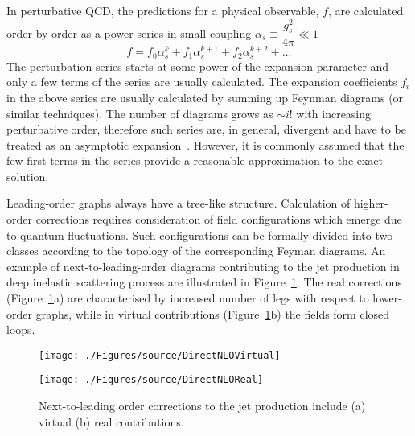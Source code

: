 In perturbative QCD, the predictions for a physical observable, $f$, are calculated order-by-order as a power series in small coupling $\alpha_s \equiv \dfrac{g_s^2}{4\pi} \ll 1$
\begin{equation}
   f=f_{0}\alpha^{k}_s + f_{1}\alpha^{k+1}_s + f_{2}\alpha^{k+2}_s + \ldots
	 \label{eq:pertseries}
\end{equation}
The perturbation series starts at some power of the expansion parameter and only a few terms of the series are usually calculated. The expansion coefficients $f_i$ in the above series are usually calculated by summing up Feynman diagrams (or similar techniques). The number of diagrams grows as $\sim i!$ with increasing perturbative order, therefore such series are, in general, divergent and have to be treated as an asymptotic expansion~\cite{Ioffe:2010zz}. However, it is commonly assumed that the few first terms in the series provide a reasonable approximation to the exact solution.

Leading-order graphs always have a tree-like structure. Calculation of higher-order corrections requires consideration of field configurations which emerge due to quantum fluctuations. Such configurations can be formally divided into two classes according to the topology of the corresponding Feyman diagrams. An example of next-to-leading-order diagrams contributing to the jet production in deep inelastic scattering process are illustrated in Figure~\ref{fig:nlojetfeyn}. The real corrections (Figure~\ref{fig:nlojetfeyn}a) are characterised by increased number of legs with respect to lower-order graphs, while in virtual contributions (Figure~\ref{fig:nlojetfeyn}b) the fields form closed loops.
 
\begin{figure}[h]
	\begin{subfloat}[]{
		\texttt{[image: ./Figures/source/DirectNLOVirtual]}
		\label{fig:nlojetfeynvirtual}
	 }%
	\end{subfloat}\hfill
	\begin{subfloat}[]{
		\texttt{[image: ./Figures/source/DirectNLOReal]}
		\label{fig:nlojetfeynreal}
	}%
	\end{subfloat}
\caption{Next-to-leading order corrections to the jet production include (a) virtual (b) real contributions.}
\label{fig:nlojetfeyn}
\end{figure}

